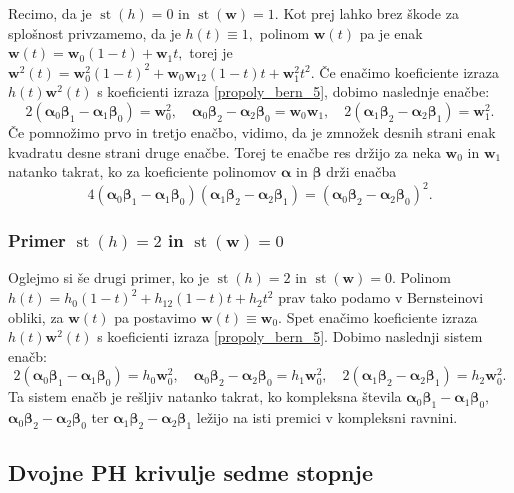 \documentclass[12pt,a4paper,twoside]{article}
\theoremstyle{definition} %
\theoremstyle{plain} %
\theoremstyle{primerstyle}
\numberwithin{equation}{section}  %
\newcommand{\wV}{\mathbf{w}}
\newcommand{\balpha}{\boldsymbol \alpha}
\newcommand{\bbeta}{\boldsymbol \beta}
\DeclareMathOperator{\st}{st}
\begin{document}
Recimo, da je $\st(h)=0$ in $\st(\wV)=1.$ Kot prej lahko brez škode za splošnost privzamemo, da je $h(t)\equiv1,$ polinom $\wV(t)$ pa je enak $\wV(t)=\wV_0(1-t)+\wV_1t,$ torej je $\wV^2(t)=\wV_0^2(1-t)^2+\wV_0\wV_12(1-t)t+\wV_1^2t^2.$ Če enačimo koeficiente izraza $h(t)\wV^2(t)$ s koeficienti izraza \eqref{propoly_bern_5}, dobimo naslednje enačbe:
\begin{equation}
	2(\balpha_0\bbeta_1-\balpha_1\bbeta_0)=\wV_0^2,\quad \balpha_0\bbeta_2-\balpha_2\bbeta_0=\wV_0\wV_1,\quad 2(\balpha_1\bbeta_2-\balpha_2\bbeta_1)=\wV_1^2.
\end{equation}
Če pomnožimo prvo in tretjo enačbo, vidimo, da je zmnožek desnih strani enak kvadratu desne strani druge enačbe. Torej te enačbe res držijo za neka $\wV_0$ in $\wV_1$ natanko takrat, ko za koeficiente polinomov $\balpha$ in $\bbeta$ drži enačba
\begin{equation}
	\label{st5h0w1}
	4(\balpha_0\bbeta_1-\balpha_1\bbeta_0)(\balpha_1\bbeta_2-\balpha_2\bbeta_1)=(\balpha_0\bbeta_2-\balpha_2\bbeta_0)^2.
\end{equation}

\subsubsection{Primer \texorpdfstring{$\st(h)=2$}{st(h)=2} in \texorpdfstring{$\st(\wV)=0$}{st(w)=0}}

Oglejmo si še drugi primer, ko je $\st(h)=2$ in $\st(\wV)=0.$ Polinom $h(t)=h_0(1-t)^2+h_12(1-t)t+h_2t^2$ prav tako podamo v Bernsteinovi obliki, za $\wV(t)$ pa postavimo $\wV(t)\equiv\wV_0.$ Spet enačimo koeficiente izraza $h(t)\wV^2(t)$ s koeficienti izraza \eqref{propoly_bern_5}. Dobimo naslednji sistem enačb:
\begin{equation}
	2(\balpha_0\bbeta_1-\balpha_1\bbeta_0)=h_0\wV_0^2,\quad \balpha_0\bbeta_2-\balpha_2\bbeta_0=h_1\wV_0^2,\quad 2(\balpha_1\bbeta_2-\balpha_2\bbeta_1)=h_2\wV_0^2.\label{st5h2w0}
\end{equation}
Ta sistem enačb je rešljiv natanko takrat, ko kompleksna števila $\balpha_0\bbeta_1-\balpha_1\bbeta_0,$ $\balpha_0\bbeta_2-\balpha_2\bbeta_0$ ter $\balpha_1\bbeta_2-\balpha_2\bbeta_1$ ležijo na isti premici v kompleksni ravnini.

\subsection{Dvojne PH krivulje sedme stopnje}
\label{poglavje_dvojnePHkrivulje7}
\end{document}
